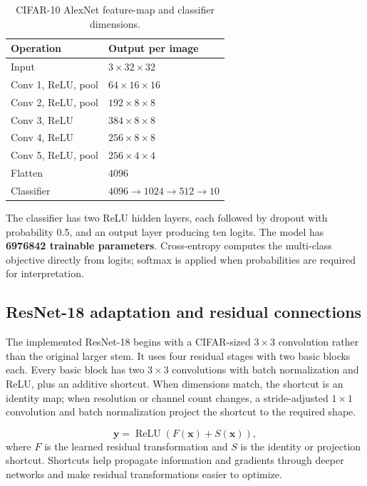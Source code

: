 \documentclass[11pt,a4paper]{article}
\begin{document}
\begin{table}[htbp]\centering\small
\caption{CIFAR-10 AlexNet feature-map and classifier dimensions.}
\begin{tabular}{ll}\toprule
Operation & Output per image\\\midrule
Input & $3\times32\times32$\\
Conv 1, ReLU, pool & $64\times16\times16$\\
Conv 2, ReLU, pool & $192\times8\times8$\\
Conv 3, ReLU & $384\times8\times8$\\
Conv 4, ReLU & $256\times8\times8$\\
Conv 5, ReLU, pool & $256\times4\times4$\\
Flatten & $4096$\\
Classifier & $4096\rightarrow1024\rightarrow512\rightarrow10$\\\bottomrule
\end{tabular}\end{table}

The classifier has two ReLU hidden layers, each followed by dropout with probability 0.5, and an output layer producing ten logits. The model has \textbf{\num{6976842} trainable parameters}. Cross-entropy computes the multi-class objective directly from logits; softmax is applied when probabilities are required for interpretation.

\subsection{ResNet-18 adaptation and residual connections}
The implemented ResNet-18 begins with a CIFAR-sized $3\times3$ convolution rather than the original larger stem. It uses four residual stages with two basic blocks each. Every basic block has two $3\times3$ convolutions with batch normalization and ReLU, plus an additive shortcut. When dimensions match, the shortcut is an identity map; when resolution or channel count changes, a stride-adjusted $1\times1$ convolution and batch normalization project the shortcut to the required shape.

\begin{equation}
\mathbf{y}=\operatorname{ReLU}\!\left(F(\mathbf{x})+S(\mathbf{x})\right),
\end{equation}
where $F$ is the learned residual transformation and $S$ is the identity or projection shortcut. Shortcuts help propagate information and gradients through deeper networks and make residual transformations easier to optimize.
\end{document}
